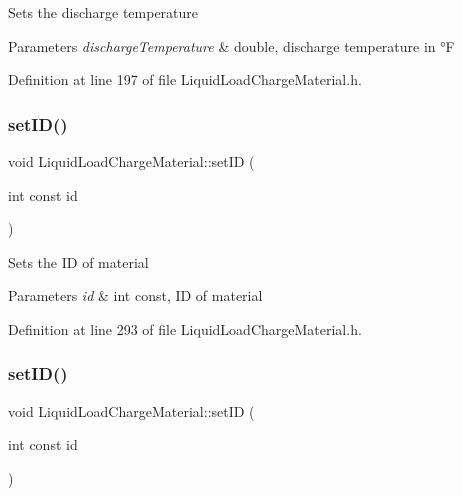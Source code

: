 Sets the discharge temperature 
\begin{DoxyParams}{Parameters}
{\em discharge\+Temperature} & double, discharge temperature in °F \\
\hline
\end{DoxyParams}


Definition at line 197 of file Liquid\+Load\+Charge\+Material.\+h.

\mbox{\label{class_liquid_load_charge_material_a192946f14996795396354f3e15b9e30b}} 
\subsubsection{\texorpdfstring{set\+I\+D()}{setID()}\hspace{0.1cm}{\footnotesize\ttfamily [1/3]}}
{\footnotesize\ttfamily void Liquid\+Load\+Charge\+Material\+::set\+ID (\begin{DoxyParamCaption}\item[{int const}]{id }\end{DoxyParamCaption})\hspace{0.3cm}{\ttfamily [inline]}}

Sets the ID of material 
\begin{DoxyParams}{Parameters}
{\em id} & int const, ID of material \\
\hline
\end{DoxyParams}


Definition at line 293 of file Liquid\+Load\+Charge\+Material.\+h.

\mbox{\label{class_liquid_load_charge_material_a192946f14996795396354f3e15b9e30b}} 
\subsubsection{\texorpdfstring{set\+I\+D()}{setID()}\hspace{0.1cm}{\footnotesize\ttfamily [2/3]}}
{\footnotesize\ttfamily void Liquid\+Load\+Charge\+Material\+::set\+ID (\begin{DoxyParamCaption}\item[{int const}]{id }\end{DoxyParamCaption})\hspace{0.3cm}{\ttfamily [inline]}}

